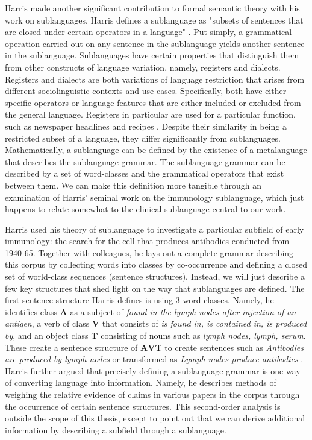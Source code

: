 Harris made another significant contribution to formal semantic theory with his work on sublanguages. Harris defines a sublanguage as "subsets of sentences that are closed under certain operators in a language" \cite{harrisTheoryLanguageInformation1991}. Put simply, a grammatical operation carried out on any sentence in the sublanguage yields another sentence in the sublanguage. Sublanguages have certain properties that distinguish them from other constructs of language variation, namely, registers and dialects. Registers and dialects are both variations of language restriction that arises from different sociolinguistic contexts and use cases. Specifically, both have either specific operators or language features that are either included or excluded from the general language. Registers in particular are used for a particular function, such as newspaper headlines and recipes \cite{zwickyChapterRegisterDimension2015}. Despite their similarity in being a restricted subset of a language, they differ significantly from sublanguages. Mathematically, a sublanguage can be defined by the existence of a metalanguage that describes the sublanguage grammar. The sublanguage grammar can be described by a set of word-classes and the grammatical operators that exist between them. We can make this definition more tangible through an examination of Harris' seminal work on the immunology sublanguage, which just happens to relate somewhat to the clinical sublanguage central to our work. 

Harris used his theory of sublanguage to investigate a particular subfield of early immunology: the search for the cell that produces antibodies conducted from 1940-65. Together with colleagues, he lays out a complete grammar describing this corpus by collecting words into classes by co-occurrence and defining a closed set of world-class sequences (sentence structures).  Instead, we will just describe a few key structures that shed light on the way that sublanguages are defined. The first sentence structure Harris defines is using 3 word classes. Namely, he identifies class $\mathbf{A}$ as a subject of \emph{found in the lymph nodes after injection of an antigen}, a verb of class $\mathbf{V}$ that consists of \emph{is found in, is contained in, is produced by}, and an object class $\mathbf{T}$ consisting of nouns such as \emph{lymph nodes, lymph, serum}. These create a sentence structure of $\mathbf{AVT}$ to create sentences such as \emph{Antibodies are produced by lymph nodes} or transformed as \emph{Lymph nodes produce antibodies} \cite{harris2012form}. Harris further argued that precisely defining a sublanguage grammar is one way of converting language into information. Namely, he describes methods of weighing the relative evidence of claims in various papers in the corpus through the occurrence of certain sentence structures. This second-order analysis is outside the scope of this thesis, except to point out that we can derive additional information by describing a subfield through a sublanguage. 
